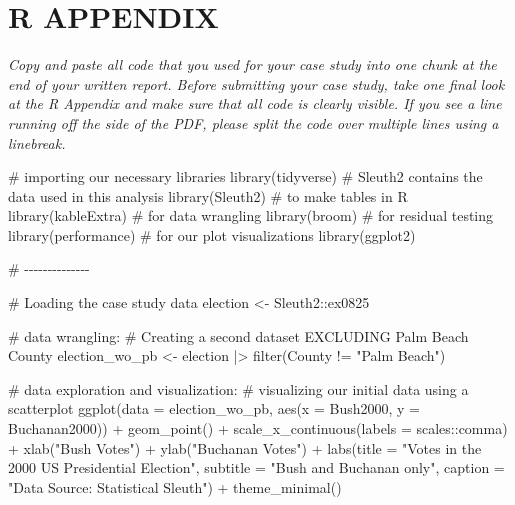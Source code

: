 \documentclass[
  letterpaper,
  DIV=11,
  numbers=noendperiod]{scrartcl}
\newenvironment{Shaded}{\begin{snugshade}}{\end{snugshade}}
\newcommand{\AttributeTok}[1]{\textcolor[rgb]{0.40,0.45,0.13}{#1}}
\newcommand{\CommentTok}[1]{\textcolor[rgb]{0.37,0.37,0.37}{#1}}
\newcommand{\FunctionTok}[1]{\textcolor[rgb]{0.28,0.35,0.67}{#1}}
\newcommand{\NormalTok}[1]{\textcolor[rgb]{0.00,0.23,0.31}{#1}}
\newcommand{\OtherTok}[1]{\textcolor[rgb]{0.00,0.23,0.31}{#1}}
\newcommand{\SpecialCharTok}[1]{\textcolor[rgb]{0.37,0.37,0.37}{#1}}
\newcommand{\StringTok}[1]{\textcolor[rgb]{0.13,0.47,0.30}{#1}}
\begin{document}
\hypertarget{r-appendix}{%
\section{R APPENDIX}\label{r-appendix}}

\emph{Copy and paste all code that you used for your case study into one
chunk at the end of your written report. Before submitting your case
study, take one final look at the R Appendix and make sure that all code
is clearly visible. If you see a line running off the side of the PDF,
please split the code over multiple lines using a linebreak.}

\begin{Shaded}
\begin{Highlighting}[]
\CommentTok{\# importing our necessary libraries}
\FunctionTok{library}\NormalTok{(tidyverse)}
\CommentTok{\# Sleuth2 contains the data used in this analysis}
\FunctionTok{library}\NormalTok{(Sleuth2) }
\CommentTok{\# to make tables in R}
\FunctionTok{library}\NormalTok{(kableExtra) }
\CommentTok{\# for data wrangling}
\FunctionTok{library}\NormalTok{(broom)}
\CommentTok{\# for residual testing}
\FunctionTok{library}\NormalTok{(performance)}
\CommentTok{\# for our plot visualizations}
\FunctionTok{library}\NormalTok{(ggplot2)}

\CommentTok{\# {-}{-}{-}{-}{-}{-}{-}{-}{-}{-}{-}{-}{-}{-}}

\CommentTok{\# Loading the case study data}
\NormalTok{election }\OtherTok{\textless{}{-}}\NormalTok{ Sleuth2}\SpecialCharTok{::}\NormalTok{ex0825}

\CommentTok{\# data wrangling:}
\CommentTok{\# Creating a second dataset EXCLUDING Palm Beach County }
\NormalTok{election\_wo\_pb }\OtherTok{\textless{}{-}}\NormalTok{ election }\SpecialCharTok{|\textgreater{}} \FunctionTok{filter}\NormalTok{(County }\SpecialCharTok{!=} \StringTok{"Palm Beach"}\NormalTok{)}

\CommentTok{\# data exploration and visualization: }
\CommentTok{\# visualizing our initial data using a scatterplot}
\FunctionTok{ggplot}\NormalTok{(}\AttributeTok{data =}\NormalTok{ election\_wo\_pb, }\FunctionTok{aes}\NormalTok{(}\AttributeTok{x =}\NormalTok{ Bush2000, }\AttributeTok{y =}\NormalTok{ Buchanan2000)) }\SpecialCharTok{+}
  \FunctionTok{geom\_point}\NormalTok{() }\SpecialCharTok{+}
  \FunctionTok{scale\_x\_continuous}\NormalTok{(}\AttributeTok{labels =}\NormalTok{ scales}\SpecialCharTok{::}\NormalTok{comma) }\SpecialCharTok{+} 
  \FunctionTok{xlab}\NormalTok{(}\StringTok{"Bush Votes"}\NormalTok{) }\SpecialCharTok{+}
  \FunctionTok{ylab}\NormalTok{(}\StringTok{"Buchanan Votes"}\NormalTok{) }\SpecialCharTok{+} 
  \FunctionTok{labs}\NormalTok{(}\AttributeTok{title =} \StringTok{"Votes in the 2000 US Presidential Election"}\NormalTok{, }\AttributeTok{subtitle =} \StringTok{"Bush and Buchanan only"}\NormalTok{, }\AttributeTok{caption =} \StringTok{"Data Source: Statistical Sleuth"}\NormalTok{) }\SpecialCharTok{+}
  \FunctionTok{theme\_minimal}\NormalTok{()}
\end{Highlighting}
\end{Shaded}
\end{document}
